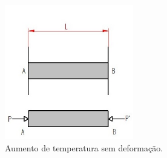 \begin{figure}[H]
	\begin{center}
	\caption{Aumento de temperatura sem deformação.}
    	\includegraphics[width=0.5\textwidth]{Resistencia-dos-materiais/Imagens/Variacao-de-temperatura-sem-deformacao.jpg}
	\end{center}
\end{figure}